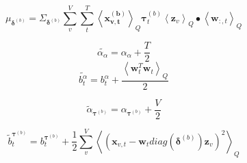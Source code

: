 \documentclass[10pt]{article}
\newcommand{\Angle}[1]{\left \langle #1 \right \rangle}
\newcommand{\Eq}[1]{\Angle{#1}_Q}
\begin{document}
    \begin{equation}
        \mu_{\bm{\delta}^{(b)}}=\Sigma_{\bm{\delta}^{(b)}}\sum_v^V\sum_t^T\Eq{\bm{x_{v,t}^{(b)}}}\bm{\tau}^{(b)}_t\Eq{\bm{z}_v}\bullet\Eq{\bm{w}_{:,t}}
    \end{equation}

    \begin{equation}
        \tilde{\alpha_{\alpha}} = \alpha_{\alpha} + \frac{T}{2}
    \end{equation}
    \begin{equation}
        \tilde{b^{\alpha}_t} = b^{\alpha}_t + \frac{\Eq{\bm{w}_t^T\bm{w}_t}}{2}
    \end{equation}

    \begin{equation}
        \tilde{\alpha}_{\bm{\tau}^{(b)}} = \alpha_{\bm{\tau}^{(b)}} + \frac{V}{2}
    \end{equation}

    \begin{equation}
        \tilde{b}_t^{\bm{\tau}^{(b)}} = b_t^{\bm{\tau}^{(b)}} + \frac{1}{2}\sum_v^V\Eq{(\bm{x}_{v,t} - \bm{w}_tdiag(\bm{\delta}^{(b)})\bm{z}_v)^2}
    \end{equation}
\end{document}

